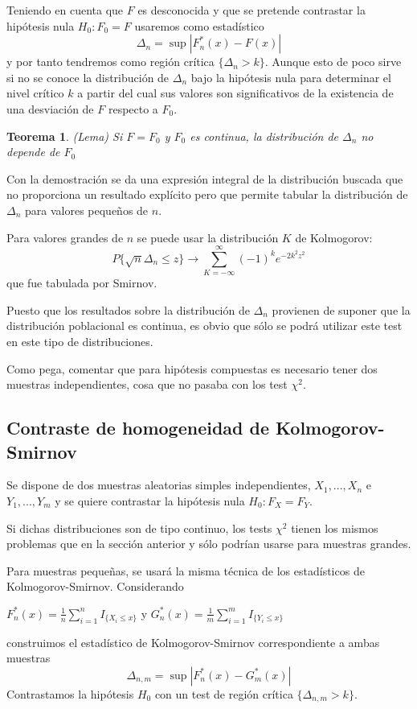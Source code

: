 \documentclass[a4paper,12pt]{article}
\newtheorem{theorem}{Teorema}
\begin{document}
Teniendo en cuenta que $F$ es desconocida y que se pretende contrastar la hipótesis nula $H_0 : F_0 = F$ usaremos como estadístico
$$\Delta_n = \sup |F^*_n(x) - F(x)|  $$
y por tanto tendremos como región crítica $\{\Delta_n > k\}$. Aunque esto de poco sirve si no se conoce la distribución de $\Delta_n$ bajo la hipótesis nula para determinar el nivel crítico $k$ a partir del cual sus valores son significativos de la existencia de una desviación de $F$ respecto a $F_0$.

\begin{theorem}
(Lema) Si $F = F_0$ y $F_0$ es continua, la distribución de $\Delta_n$ no depende de $F_0$
\end{theorem}
Con la demostración se da una expresión integral de la distribución buscada que no proporciona un resultado explícito pero que permite tabular la distribución de $\Delta_n$ para valores pequeños de $n$.

Para valores grandes de $n$ se puede usar la distribución $K$ de Kolmogorov:
$$P\{\sqrt{n}\Delta_n \leq z \} \longrightarrow \sum^{\infty}_{K=-\infty} (-1)^{k} e^{-2k^2 z^2}  $$
que fue tabulada por Smirnov.

Puesto que los resultados sobre la distribución de $\Delta_n$ provienen de suponer que la distribución poblacional es continua, es obvio que sólo se podrá utilizar este test en este tipo de distribuciones.

Como pega, comentar que para hipótesis compuestas es necesario tener dos muestras independientes, cosa que no pasaba con los test $\chi^2$.



\subsection{Contraste de homogeneidad de Kolmogorov-Smirnov}

Se dispone de dos muestras aleatorias simples independientes, $X_1,...,X_n $ e $Y_1,...,Y_m$ y se quiere contrastar la hipótesis nula $H_0:F_X = F_Y$.

Si dichas distribuciones son de tipo continuo, los tests $\chi^2$ tienen los mismos problemas que en la sección anterior y sólo podrían usarse para muestras grandes.

Para muestras pequeñas, se usará la misma técnica de los estadísticos de Kolmogorov-Smirnov. Considerando
\begin{center}
$F^*_n (x)=\frac{1}{n}\sum_{i=1}^n I_{\{X_i \leq x\}}$ y $G^*_n (x)=\frac{1}{m}\sum_{i=1}^m I_{\{Y_i \leq x\}}$
\end{center}
construimos el estadístico de Kolmogorov-Smirnov correspondiente a ambas muestras $$\Delta_{n,m}=\sup|F^*_n(x)-G^*_m (x)|$$
Contrastamos la hipótesis $H_0$ con un test de región crítica $\{ \Delta_{n,m} > k\}$.
\end{document}
